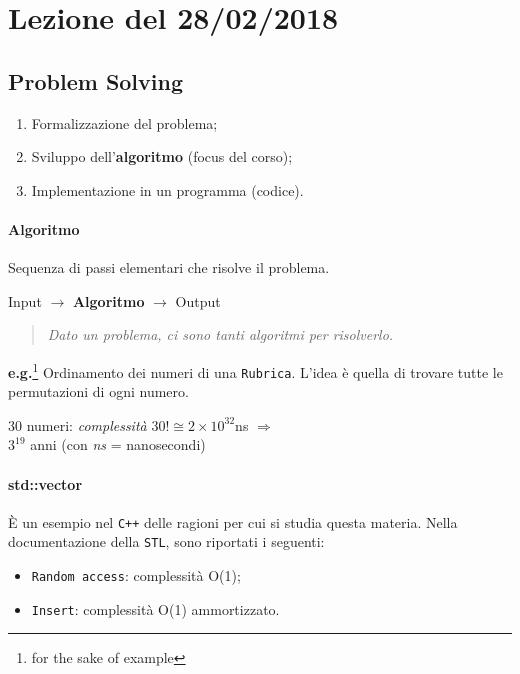\section{Lezione del 28/02/2018}

\subsection{Problem Solving}
\begin{enumerate}
	\item Formalizzazione del problema;
	\item Sviluppo dell'\textbf{algoritmo} (focus del corso);
	\item Implementazione in un programma (codice).
\end{enumerate}

\paragraph{Algoritmo} Sequenza di passi elementari che risolve il problema.\par

\begin{center}
	Input $\rightarrow$ \textbf{Algoritmo} $\rightarrow$ Output
\end{center}

\begin{quote} 
	\textit{Dato un problema, ci sono tanti algoritmi per risolverlo.}
\end{quote}

\noindent \textbf{e.g.}\footnote{for the sake of example} Ordinamento dei numeri di una \texttt{Rubrica}.
L'idea è quella di trovare tutte le permutazioni di ogni numero.\par

\begin{center}
	30 numeri: \textit{complessità} $30! \cong 2 \times 10^{32}$ns $\Rightarrow$ \\
	$3^{19}$ anni (con \textit{ns} = nanosecondi)
\end{center}

\paragraph{std::vector} È un esempio nel \texttt{C++} delle ragioni per cui 
si studia questa materia. Nella documentazione della \texttt{STL}, 
sono riportati i seguenti:

\begin{itemize}
	\item \texttt{Random access}: complessità O(1);
	\item \texttt{Insert}: complessità O(1) ammortizzato.
\end{itemize}

